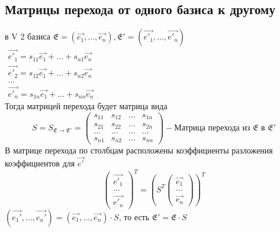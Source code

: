	\subsection{Матрицы перехода от одного базиса к другому}
	в V 2 базиса \(\mathfrak{E} = (\vec{e_1},\ldots,\vec{e_n}), \mathfrak{E}' = (\vec{e'_1}, \ldots, \vec{e'_n})\)\\
	\(\begin{gathered}
		\vec{e'_1} = s_{11}\vec{e_1}+\ldots+s_{n1}\vec{e_n} \\
		\vec{e'_2} = s_{12}\vec{e_1}+\ldots+s_{n2}\vec{e_n} \\
		\ldots \\
		\vec{e'_n} = s_{1n}\vec{e_1}+\ldots+s_{nn}\vec{e_n} 
	\end{gathered}\)\\ Тогда матрицей перехода будет матрица вида 
	\[S = S_{\mathfrak{E}\to\mathfrak{E}'} = \begin{pmatrix}
		s_{11} & s_{12} & \ldots & s_{1n} \\
		s_{21} & s_{22} & \ldots & s_{2n} \\
		\ldots & \ldots & \ldots & \ldots \\
		s_{n1} & s_{n2} & \ldots & s_{nn}
	\end{pmatrix} - \text{Матрица перехода из $\mathfrak{E}$ в $\mathfrak{E}'$}\]
	В матрице перехода по столбцам расположены коэффициенты разложения коэффициентов для $\vec{e'}$
	\[\begin{pmatrix}
		\vec{e'_1} \\ \ldots \\ \vec{e'_n}
	\end{pmatrix}^T = \left(S^T\begin{pmatrix}
	\vec{e_1} \\ \ldots \\ \vec{e_n}
	\end{pmatrix}\right)^T\] 
	\((\vec{e_1'}, \ldots, \vec{e_n'}) = (\vec{e_1}, \ldots, \vec{e_n})\cdot S\), то есть \(\mathfrak{E'} = \mathfrak{E}\cdot S\)
